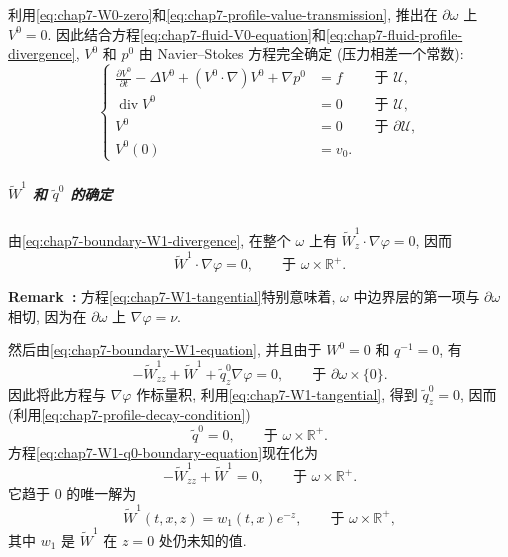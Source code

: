 \begin{sloppypar}
利用\eqref{eq:chap7-W0-zero}和\eqref{eq:chap7-profile-value-transmission}, 推出在 $\partial\omega$ 上 $V^0=0$. 因此结合方程\eqref{eq:chap7-fluid-V0-equation}和\eqref{eq:chap7-fluid-profile-divergence}, $V^0$ 和 $p^0$ 由 Navier--Stokes 方程完全确定 (压力相差一个常数):
\[
\left\{
\begin{aligned}
 \frac{\partial V^0}{\partial t}-\Delta V^0+(V^0\cdot\nabla)V^0+\nabla p^0&=f&&\text{于 }\mathcal U,\\
 \operatorname{div}V^0&=0&&\text{于 }\mathcal U,\\
 V^0&=0&&\text{于 }\partial\mathcal U,\\
 V^0(0)&=v_0.&
\end{aligned}
\right.
\]

\subparagraph{$\widetilde W^1$ 和 $\widetilde q^0$ 的确定}

由\eqref{eq:chap7-boundary-W1-divergence}, 在整个 $\omega$ 上有 $\widetilde W^1_z\cdot\nabla\varphi=0$, 因而
\begin{equation}
 \widetilde W^1\cdot\nabla\varphi=0,
 \qquad\text{于 }\omega\times\mathbb R^+.
\label{eq:chap7-W1-tangential}
\end{equation}

\par\noindent{}\textbf{Remark~\thechaptersevensectiontworemark:}\label{rem:chap7-first-boundary-layer-tangential}
方程\eqref{eq:chap7-W1-tangential}特别意味着, $\omega$ 中边界层的第一项与 $\partial\omega$ 相切, 因为在 $\partial\omega$ 上 $\nabla\varphi=\nu$.

然后由\eqref{eq:chap7-boundary-W1-equation}, 并且由于 $W^0=0$ 和 $q^{-1}=0$, 有
\begin{equation}
 -\widetilde W^1_{zz}+\widetilde W^1+\widetilde q^0_z\nabla\varphi=0,
 \qquad\text{于 }\partial\omega\times\{0\}.
\label{eq:chap7-W1-q0-boundary-equation}
\end{equation}
因此将此方程与 $\nabla\varphi$ 作标量积, 利用\eqref{eq:chap7-W1-tangential}, 得到 $\widetilde q^0_z=0$, 因而 (利用\eqref{eq:chap7-profile-decay-condition})
\begin{equation}
 \widetilde q^0=0,\qquad\text{于 }\omega\times\mathbb R^+.
\label{eq:chap7-q0-boundary-zero}
\end{equation}
方程\eqref{eq:chap7-W1-q0-boundary-equation}现在化为
\[
 -\widetilde W^1_{zz}+\widetilde W^1=0,
 \qquad\text{于 }\omega\times\mathbb R^+.
\]
它趋于 $0$ 的唯一解为
\begin{equation}
 \widetilde W^1(t,x,z)=w_1(t,x)e^{-z},
 \qquad\text{于 }\omega\times\mathbb R^+,
\label{eq:chap7-W1-exponential-profile}
\end{equation}
其中 $w_1$ 是 $\widetilde W^1$ 在 $z=0$ 处仍未知的值.


\end{sloppypar}
